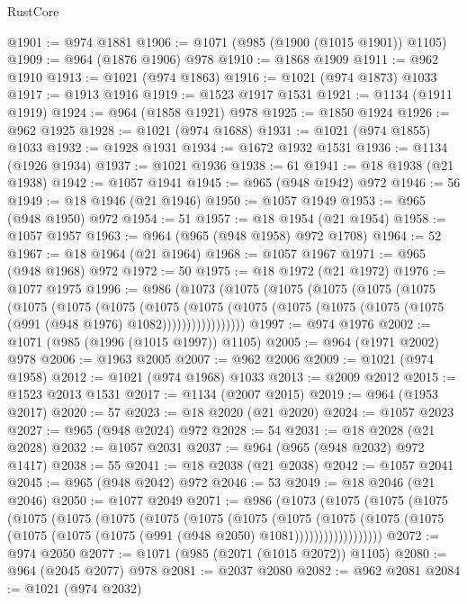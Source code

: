 \begin{lexlean}{RustCore}
\begin{coremodule}
@1901 := @974 @1881
@1906 := @1071 (@985 (@1900 (@1015 @1901)) @1105)
@1909 := @964 (@1876 @1906) @978
@1910 := @1868 @1909
@1911 := @962 @1910
@1913 := @1021 (@974 @1863)
@1916 := @1021 (@974 @1873) @1033
@1917 := @1913 @1916
@1919 := @1523 @1917 @1531
@1921 := @1134 (@1911 @1919)
@1924 := @964 (@1858 @1921) @978
@1925 := @1850 @1924
@1926 := @962 @1925
@1928 := @1021 (@974 @1688)
@1931 := @1021 (@974 @1855) @1033
@1932 := @1928 @1931
@1934 := @1672 @1932 @1531
@1936 := @1134 (@1926 @1934)
@1937 := @1021 @1936
@1938 := 61
@1941 := @18 @1938 (@21 @1938)
@1942 := @1057 @1941
@1945 := @965 (@948 @1942) @972
@1946 := 56
@1949 := @18 @1946 (@21 @1946)
@1950 := @1057 @1949
@1953 := @965 (@948 @1950) @972
@1954 := 51
@1957 := @18 @1954 (@21 @1954)
@1958 := @1057 @1957
@1963 := @964 (@965 (@948 @1958) @972 @1708)
@1964 := 52
@1967 := @18 @1964 (@21 @1964)
@1968 := @1057 @1967
@1971 := @965 (@948 @1968) @972
@1972 := 50
@1975 := @18 @1972 (@21 @1972)
@1976 := @1077 @1975
@1996 := @986
    (@1073
      (@1075
        (@1075
          (@1075
            (@1075
              (@1075
                (@1075
                  (@1075
                    (@1075
                      (@1075
                        (@1075
                          (@1075
                            (@1075 (@1075 (@1075 (@1075 (@991 (@948 @1976) @1082)))))))))))))))))
@1997 := @974 @1976
@2002 := @1071 (@985 (@1996 (@1015 @1997)) @1105)
@2005 := @964 (@1971 @2002) @978
@2006 := @1963 @2005
@2007 := @962 @2006
@2009 := @1021 (@974 @1958)
@2012 := @1021 (@974 @1968) @1033
@2013 := @2009 @2012
@2015 := @1523 @2013 @1531
@2017 := @1134 (@2007 @2015)
@2019 := @964 (@1953 @2017)
@2020 := 57
@2023 := @18 @2020 (@21 @2020)
@2024 := @1057 @2023
@2027 := @965 (@948 @2024) @972
@2028 := 54
@2031 := @18 @2028 (@21 @2028)
@2032 := @1057 @2031
@2037 := @964 (@965 (@948 @2032) @972 @1417)
@2038 := 55
@2041 := @18 @2038 (@21 @2038)
@2042 := @1057 @2041
@2045 := @965 (@948 @2042) @972
@2046 := 53
@2049 := @18 @2046 (@21 @2046)
@2050 := @1077 @2049
@2071 := @986
    (@1073
      (@1075
        (@1075
          (@1075
            (@1075
              (@1075
                (@1075
                  (@1075
                    (@1075
                      (@1075
                        (@1075
                          (@1075
                            (@1075
                              (@1075 (@1075 (@1075 (@1075 (@991 (@948 @2050) @1081))))))))))))))))))
@2072 := @974 @2050
@2077 := @1071 (@985 (@2071 (@1015 @2072)) @1105)
@2080 := @964 (@2045 @2077) @978
@2081 := @2037 @2080
@2082 := @962 @2081
@2084 := @1021 (@974 @2032)

\end{coremodule}
\end{lexlean}
